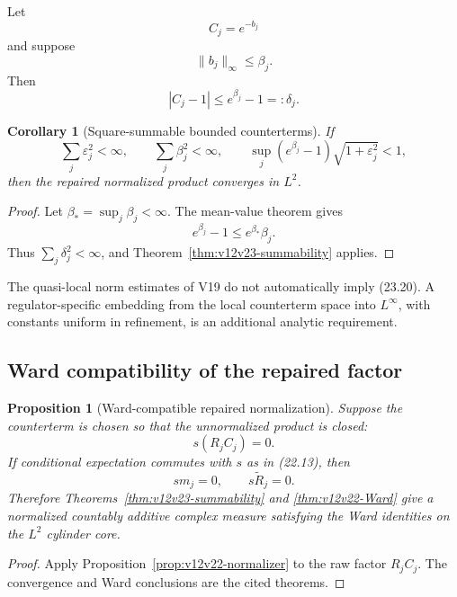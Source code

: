 \documentclass[11pt]{article}
\newtheorem{proposition}[theorem]{Proposition}
\newtheorem{corollary}[theorem]{Corollary}
\theoremstyle{remark}
\begin{document}
Let
\[
                         C_j=e^{-b_j}                       \tag{23.19}
\]
and suppose
\[
                         \|b_j\|_\infty\le\beta_j.           \tag{23.20}
\]
Then
\[
                         |C_j-1|
 \le e^{\beta_j}-1=:\delta_j.                              \tag{23.21}
\]

\begin{corollary}[Square-summable bounded counterterms]
\label{cor:v12v23-exponential}
If
\[
 \sum_j\varepsilon_j^2<\infty,\qquad
 \sum_j\beta_j^2<\infty,\qquad
 \sup_j(e^{\beta_j}-1)\sqrt{1+\varepsilon_j^2}<1,           \tag{23.22}
\]
then the repaired normalized product converges in \(L^2\).
\end{corollary}

\begin{proof}
Let \(\beta_*=\sup_j\beta_j<\infty\).  The mean-value theorem gives
\[
                         e^{\beta_j}-1
 \le e^{\beta_*}\beta_j.
\]
Thus \(\sum_j\delta_j^2<\infty\), and
Theorem~\ref{thm:v12v23-summability} applies.
\end{proof}

The quasi-local norm estimates of V19 do not automatically imply
(23.20).  A regulator-specific embedding from the local counterterm
space into \(L^\infty\), with constants uniform in refinement, is an
additional analytic requirement.

\subsection{Ward compatibility of the repaired factor}

\begin{proposition}[Ward-compatible repaired normalization]
\label{prop:v12v23-Ward}
Suppose the counterterm is chosen so that the unnormalized product is
closed:
\[
                         s(R_jC_j)=0.                       \tag{23.23}
\]
If conditional expectation commutes with \(s\) as in (22.13), then
\[
                         sm_j=0,\qquad s\widetilde R_j=0.   \tag{23.24}
\]
Therefore Theorems~\ref{thm:v12v23-summability} and
\ref{thm:v12v22-Ward} give a normalized countably additive complex
measure satisfying the Ward identities on the \(L^2\) cylinder core.
\end{proposition}

\begin{proof}
Apply Proposition~\ref{prop:v12v22-normalizer} to the raw factor
\(R_jC_j\).  The convergence and Ward conclusions are the cited
theorems.
\end{proof}
\end{document}
